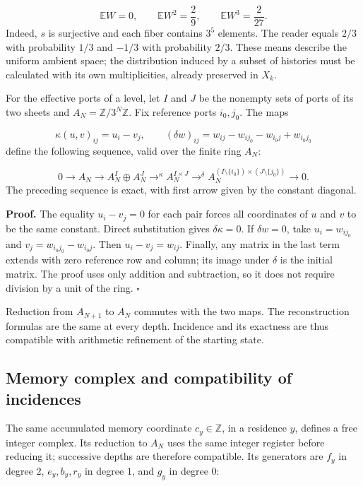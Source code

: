 \[
\mathbb EW=0,\qquad
\mathbb EW^2=\frac29,\qquad
\mathbb EW^3=\frac2{27}.
\]
Indeed, \(s\) is surjective and each fiber contains \(3^5\) elements. The reader equals \(2/3\) with probability \(1/3\) and \(-1/3\) with probability \(2/3\). These means describe the uniform ambient space; the distribution induced by a subset of histories must be calculated with its own multiplicities, already preserved in \(X_k\).

For the effective ports of a level, let \(I\) and \(J\) be the nonempty sets of ports of its two sheets and \(A_N=\mathbb Z/3^N\mathbb Z\). Fix reference ports \(i_0,j_0\). The maps

\[
\kappa(u,v)_{ij}=u_i-v_j,
\qquad
(\delta w)_{ij}=w_{ij}-w_{ij_0}-w_{i_0j}+w_{i_0j_0}
\]
define the following sequence, valid over the finite ring \(A_N\):

\[
0\longrightarrow A_N\longrightarrow
A_N^I\oplus A_N^J\mathrel{\mathop{\longrightarrow}^{\kappa}}
A_N^{I\times J}\mathrel{\mathop{\longrightarrow}^{\delta}}
A_N^{(I\setminus\{i_0\})\times(J\setminus\{j_0\})}
\longrightarrow0.
\]
The preceding sequence is exact, with first arrow given by the constant diagonal.

\textbf{Proof.} The equality \(u_i-v_j=0\) for each pair forces all coordinates of \(u\) and \(v\) to be the same constant. Direct substitution gives \(\delta\kappa=0\). If \(\delta w=0\), take \(u_i=w_{ij_0}\) and \(v_j=w_{i_0j_0}-w_{i_0j}\). Then \(u_i-v_j=w_{ij}\). Finally, any matrix in the last term extends with zero reference row and column; its image under \(\delta\) is the initial matrix. The proof uses only addition and subtraction, so it does not require division by a unit of the ring. \hfill\(\square\)

Reduction from \(A_{N+1}\) to \(A_N\) commutes with the two maps. The reconstruction formulas are the same at every depth. Incidence and its exactness are thus compatible with arithmetic refinement of the starting state.

\subsection{Memory complex and compatibility of incidences}
The same accumulated memory coordinate \(c_y\in\mathbb Z\), in a residence \(y\), defines a free integer complex. Its reduction to \(A_N\) uses the same integer register before reducing it; successive depths are therefore compatible. Its generators are \(f_y\) in degree \(2\), \(e_y,b_y,r_y\) in degree \(1\), and \(g_y\) in degree \(0\):

